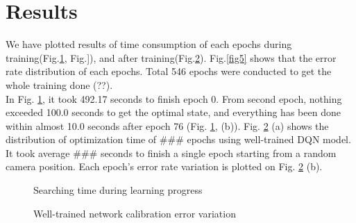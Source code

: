 \documentclass[10pt]{article}
\begin{document}
\section{Results}
We have plotted results of time consumption of each epochs during training(Fig.\ref{fig3}, Fig.]), and after training(Fig.\ref{fig4}).
 Fig.\ref{fig5} shows that the error rate distribution of each epochs. Total 546 epochs were conducted to get the whole training done (??).
\\In Fig. \ref{fig3}, it took 492.17 seconds to finish epoch 0. From second epoch, nothing exceeded 100.0 seconds to get the optimal state, and everything has been done within almost 10.0 seconds after epoch 76 (Fig. \ref{fig3}, (b)). Fig. \ref{fig4} (a) shows the distribution of optimization time of ### epochs using well-trained DQN model. It took average ### seconds to finish a single epoch starting from a random camera position. Each epoch's error rate variation is plotted on Fig. \ref{fig4} (b).


\begin{figure}[htb]
\begin{center}
\caption{Searching time during learning progress}
\label{fig3}
\end{center}\end{figure}


\begin{figure}[htb]
\begin{center}
\caption{Well-trained network calibration error variation}
\label{fig4}
\end{center}\end{figure}
\end{document}
